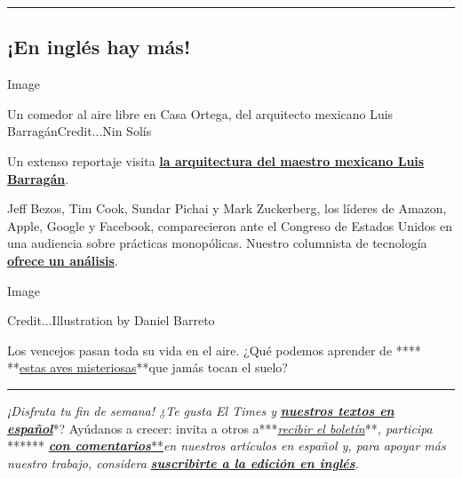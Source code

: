 \begin{center}\rule{0.5\linewidth}{\linethickness}\end{center}

\hypertarget{en-ingluxe9s-hay-muxe1s}{%
\subsection{¡En inglés hay más!}\label{en-ingluxe9s-hay-muxe1s}}

Image

Un comedor al aire libre en Casa Ortega, del arquitecto mexicano Luis
BarragánCredit...Nin Solís

Un extenso reportaje visita
\textbf{\href{https://www.nytimes3xbfgragh.onion/2020/07/24/t-magazine/luis-barragan.html}{la
arquitectura del maestro mexicano Luis Barragán}}.

Jeff Bezos, Tim Cook, Sundar Pichai y Mark Zuckerberg, los líderes de
Amazon, Apple, Google y Facebook, comparecieron ante el Congreso de
Estados Unidos en una audiencia sobre prácticas monopólicas. Nuestro
columnista de tecnología
\textbf{\href{https://www.nytimes3xbfgragh.onion/2020/07/30/technology/big-tech-ceos.html}{ofrece
un análisis}}.

Image

Credit...Illustration by Daniel Barreto

Los vencejos pasan toda su vida en el aire. ¿Qué podemos aprender de
****
**\href{https://www.nytimes3xbfgragh.onion/2020/07/29/magazine/vesper-flights.html}{estas
aves misteriosas}**que jamás tocan el suelo?

\begin{center}\rule{0.5\linewidth}{\linethickness}\end{center}

\emph{¡Disfruta tu fin de semana! ¿Te gusta El Times y}
\textbf{\href{https://www.nytimes3xbfgragh.onion/es/}{\emph{nuestros
textos en español}}}*? Ayúdanos a crecer: invita a otros
a***\href{https://www.nytimes3xbfgragh.onion/newsletters/el-times}{\emph{recibir
el boletín}}**\emph{, participa} ******
\textbf{\href{http://nytimes3xbfgragh.onion//es/2020/07/28/espanol/regreso-a-clases-covid.html\#commentsContainer}{\emph{con
comentarios}}}\href{http://nytimes3xbfgragh.onion//es/2020/07/28/espanol/regreso-a-clases-covid.html\#commentsContainer}{**}\emph{en
nuestros artículos en español y, para apoyar más nuestro trabajo,
considera}
\textbf{\href{https://www.nytimes3xbfgragh.onion/subscription}{\emph{suscribirte
a la edición en inglés}}}\emph{.}

